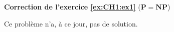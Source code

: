 \documentclass[../../TD/TD_template_CoursIsenLaTeX.tex]{subfiles}
\begin{document}
\textbf{Correction de l'exercice \ref{ex:CH1:ex1}} ($\mathbf{P} = \mathbf{NP}$)

Ce problème n'a, à ce jour, pas de solution.
\end{document}
